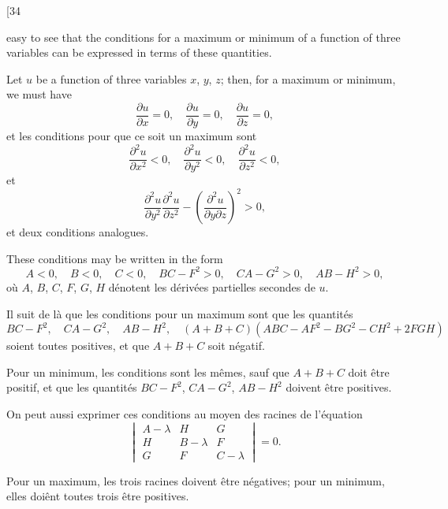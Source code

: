 \documentclass[11pt,a4paper]{book}
\begin{document}
\newpage
\setcounter{page}{228}

\begin{center}
{\small [34}
\end{center}
\vspace{-1em}

easy to see that the conditions for a maximum or minimum of a function of three
variables can be expressed in terms of these quantities.

Let $u$ be a function of three variables $x$, $y$, $z$; then, for a maximum or minimum,
we must have
\[
\frac{\partial u}{\partial x} = 0, \quad \frac{\partial u}{\partial y} = 0, \quad \frac{\partial u}{\partial z} = 0,
\]
et les conditions pour que ce soit un maximum sont
\[
\frac{\partial^2 u}{\partial x^2} < 0, \quad \frac{\partial^2 u}{\partial y^2} < 0, \quad \frac{\partial^2 u}{\partial z^2} < 0,
\]
et
\[
\frac{\partial^2 u}{\partial y^2} \frac{\partial^2 u}{\partial z^2} - \left(\frac{\partial^2 u}{\partial y \partial z}\right)^2 > 0,
\]
et deux conditions analogues.

\newpage
\setcounter{page}{229}

These conditions may be written in the form
\[
A < 0, \quad B < 0, \quad C < 0, \quad BC - F^2 > 0, \quad CA - G^2 > 0, \quad AB - H^2 > 0,
\]
o\`{u} $A$, $B$, $C$, $F$, $G$, $H$ d\'{e}notent les d\'{e}riv\'{e}es partielles secondes de $u$.

Il suit de l\`{a} que les conditions pour un maximum sont que les quantit\'{e}s
\[
BC - F^2, \quad CA - G^2, \quad AB - H^2, \quad (A+B+C)(ABC - AF^2 - BG^2 - CH^2 + 2FGH)
\]
soient toutes positives, et que $A+B+C$ soit n\'{e}gatif.

\newpage
\setcounter{page}{230}

Pour un minimum, les conditions sont les m\^{e}mes, sauf que $A+B+C$ doit \^{e}tre
positif, et que les quantit\'{e}s $BC-F^2$, $CA-G^2$, $AB-H^2$ doivent \^{e}tre positives.

On peut aussi exprimer ces conditions au moyen des racines de l'\'{e}quation
\[
\begin{vmatrix}
A - \lambda & H & G \\
H & B - \lambda & F \\
G & F & C - \lambda
\end{vmatrix} = 0.
\]

Pour un maximum, les trois racines doivent \^{e}tre n\'{e}gatives; pour un minimum, elles
doi\^{e}nt toutes trois \^{e}tre positives.

\newpage
\setcounter{page}{231}
\end{document}
